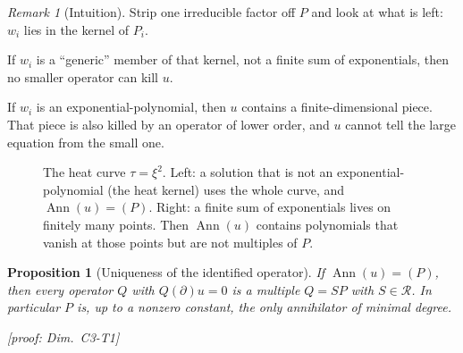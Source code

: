 \documentclass[11pt]{article}
\theoremstyle{plain}
\newtheorem{proposition}[theorem]{Proposition}
\theoremstyle{definition}
\theoremstyle{remark}
\newtheorem{remark}[theorem]{Remark}
\newcommand{\ring}{\mathcal{R}}            %
\DeclareMathOperator{\Ann}{Ann}             %
\newenvironment{intuition}{\begin{remark}[Intuition]}{\end{remark}}
\newcommand{\dimref}[1]{\textsf{\footnotesize[proof: Dim.~#1]}}
\begin{document}
\begin{intuition}
Strip one irreducible factor off $P$ and look at what is left: $w_i$ lies in the kernel of $P_i$.

If $w_i$ is a ``generic'' member of that kernel, not a finite sum of exponentials, then no smaller operator can kill $u$.

If $w_i$ is an exponential-polynomial, then $u$ contains a finite-dimensional piece. That piece is also killed by an operator of lower order, and $u$ cannot tell the large equation from the small one.
\end{intuition}

\begin{figure}[!htb]
\centering
{}\hfill
{}
\caption{The heat curve $\tau=\xi^2$. Left: a solution that is not an exponential-polynomial (the heat kernel) uses the whole curve, and $\Ann(u)=(P)$. Right: a finite sum of exponentials lives on finitely many points. Then $\Ann(u)$ contains polynomials that vanish at those points but are not multiples of $P$.}\label{fig:rich-poor}
\end{figure}

\begin{proposition}[{Uniqueness of the identified operator}]\label{f:prop:unique}
If $\Ann(u)=(P)$, then every operator $Q$ with $Q(\partial)u=0$ is a multiple $Q=SP$ with $S\in\ring$. In particular $P$ is, up to a nonzero constant, the only annihilator of minimal degree.

\dimref{C3-T1}
\end{proposition}
\end{document}
